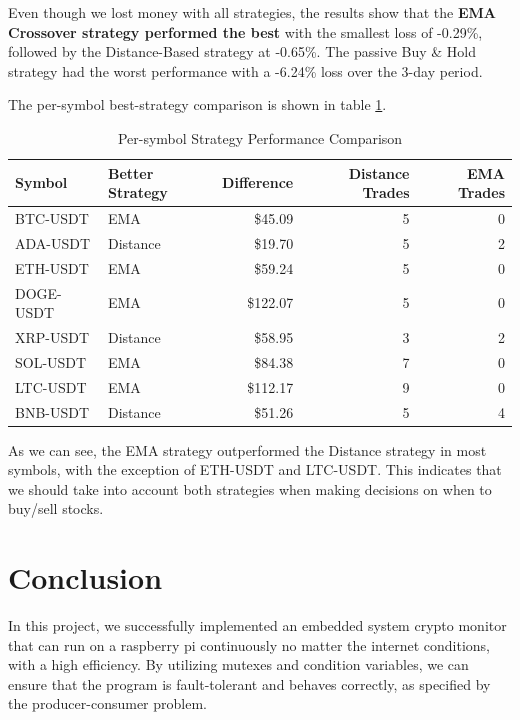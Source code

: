 \documentclass{article}
\begin{document}
Even though we lost money with all strategies, the results show that the 
\textbf{EMA Crossover strategy performed the best} with the smallest loss of -0.29\%, 
followed by the Distance-Based strategy at -0.65\%. The passive Buy \& Hold strategy had the worst 
performance with a -6.24\% loss over the 3-day period.

The per-symbol best-strategy comparison is shown in table \ref{tab:strategy-performance-symbols}.

\begin{table}[H]
    \centering
    \begin{tabular}{|l|l|r|r|r|}
        \hline
        \textbf{Symbol} & \textbf{Better Strategy} & \textbf{Difference} & \textbf{Distance Trades} & \textbf{EMA Trades} \\
        \hline
        BTC-USDT & EMA & \$45.09 & 5 & 0 \\
        \hline
        ADA-USDT & Distance & \$19.70 & 5 & 2 \\
        \hline
        ETH-USDT & EMA & \$59.24 & 5 & 0 \\
        \hline
        DOGE-USDT & EMA & \$122.07 & 5 & 0 \\
        \hline
        XRP-USDT & Distance & \$58.95 & 3 & 2 \\
        \hline
        SOL-USDT & EMA & \$84.38 & 7 & 0 \\
        \hline
        LTC-USDT & EMA & \$112.17 & 9 & 0 \\
        \hline
        BNB-USDT & Distance & \$51.26 & 5 & 4 \\
        \hline
    \end{tabular}
    \caption{Per-symbol Strategy Performance Comparison}
    \label{tab:strategy-performance-symbols}
\end{table}

As we can see, the EMA strategy outperformed the Distance strategy in most symbols, with the exception 
of ETH-USDT and LTC-USDT. This indicates that we should take into account both strategies when making
decisions on when to buy/sell stocks.

\section{Conclusion}
In this project, we successfully implemented an embedded system crypto monitor that can run on a raspberry pi
continuously no matter the internet conditions, with a high efficiency. By utilizing mutexes and condition variables,
we can ensure that the program is fault-tolerant and behaves correctly, as specified by the producer-consumer problem.
\end{document}
